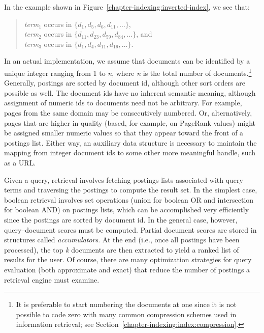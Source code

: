In the example shown in Figure~\ref{chapter-indexing:inverted-index},
we see that:
\begin{quote}
\emph{term}$_1$ occurs in $\{d_1, d_5, d_6, d_{11}, \ldots\}$, \\
\emph{term}$_2$ occurs in $\{d_{11}, d_{23}, d_{59}, d_{84}, \ldots\}$, and \\
\emph{term}$_3$ occurs in $\{d_1, d_4, d_{11}, d_{19}, \ldots\}$.
\end{quote}

In an actual implementation, we assume that documents can
be identified by a unique integer ranging from 1 to \emph{n}, where
\emph{n} is the total number of documents.\footnote{It is preferable to
  start numbering the documents at one since it is not possible to
  code zero with many common compression schemes used in information
  retrieval; see Section~\ref{chapter-indexing:index:compression}.}
Generally, postings are sorted by document id, although other sort
orders are possible as well.  The document ids have no inherent
semantic meaning, although assignment of numeric ids to documents need
not be arbitrary.  For example, pages from the same domain may be
consecutively numbered.  Or, alternatively, pages that are higher in
quality (based, for example, on PageRank values) might be assigned
smaller numeric values so that they appear toward the front of a
postings list.  Either way, an auxiliary data structure is necessary
to maintain the mapping from integer document ids to some other more
meaningful handle, such as a URL.

Given a query, retrieval involves fetching postings lists associated
with query terms and traversing the postings to compute the result
set.  In the simplest case, boolean retrieval involves set operations
(union for boolean OR and intersection for boolean AND) on postings
lists, which can be accomplished very efficiently since the postings
are sorted by document id.  In the general case, however,
query--document scores must be computed.  Partial document scores are
stored in structures called \emph{accumulators}.  At the end (i.e.,
once all postings have been processed), the top \emph{k} documents are
then extracted to yield a ranked list of results for the user.  Of
course, there are many optimization strategies for query evaluation
(both approximate and exact) that reduce the number of postings a
retrieval engine must examine.

